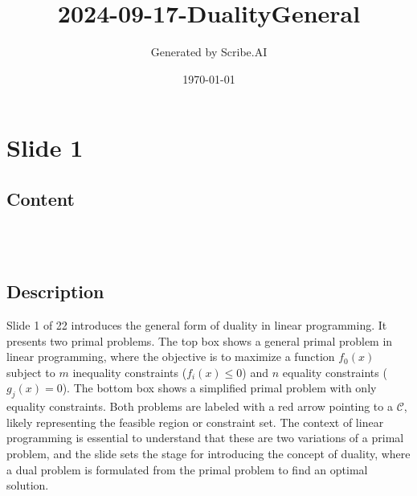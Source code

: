 \documentclass{article}%
\title{2024{-}09{-}17{-}DualityGeneral}%
\author{Generated by Scribe.AI}%
\date{\today}%
\begin{document}
%
\normalsize%
\maketitle%
\section{Slide 1}%
\label{sec:Slide1}%
\subsection{Content}%

 \\
\quad \leftarrow {} \\
\quad \leftarrow {}
%
\subsection{Description}%
Slide 1 of 22 introduces the general form of duality in linear programming.  It presents two primal problems. The top box shows a general primal problem in linear programming, where the objective is to maximize a function $f_0(x)$ subject to $m$ inequality constraints ($f_i(x) \le 0$) and $n$ equality constraints ($g_j(x) = 0$). The bottom box shows a simplified primal problem with only equality constraints.  Both problems are labeled with a red arrow pointing to a $\mathcal{C}$, likely representing the feasible region or constraint set. The context of linear programming is essential to understand that these are two variations of a primal problem, and the slide sets the stage for introducing the concept of duality, where a dual problem is formulated from the primal problem to find an optimal solution.%
\end{document}
